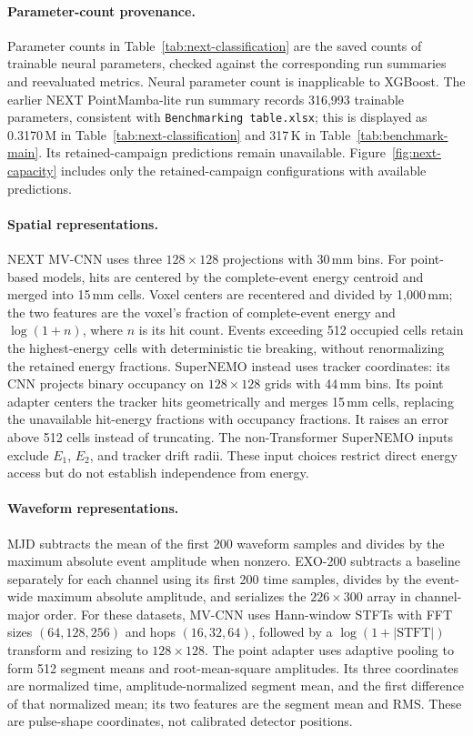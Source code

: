 \paragraph{Parameter-count provenance.}
Parameter counts in Table~\ref{tab:next-classification} are the saved
counts of trainable neural parameters, checked against the corresponding
run summaries and reevaluated metrics. Neural parameter count is
inapplicable to XGBoost. The earlier NEXT PointMamba-lite run summary records
316,993 trainable parameters, consistent with \texttt{Benchmarking table.xlsx};
this is displayed as 0.3170\,M in Table~\ref{tab:next-classification} and
317\,K in Table~\ref{tab:benchmark-main}. Its retained-campaign predictions
remain unavailable. Figure~\ref{fig:next-capacity} includes only the
retained-campaign configurations with available predictions.

\paragraph{Spatial representations.}
NEXT MV-CNN uses three $128\times128$ projections with 30\,mm bins. For point-based models, hits are centered by the complete-event energy centroid and merged into 15\,mm cells. Voxel centers are recentered and divided by 1,000\,mm; the two features are the voxel's fraction of complete-event energy and $\log(1+n)$, where $n$ is its hit count. Events exceeding 512 occupied cells retain the highest-energy cells with deterministic tie breaking, without renormalizing the retained energy fractions. SuperNEMO instead uses tracker coordinates: its CNN projects binary occupancy on $128\times128$ grids with 44\,mm bins. Its point adapter centers the tracker hits geometrically and merges 15\,mm cells, replacing the unavailable hit-energy fractions with occupancy fractions. It raises an error above 512 cells instead of truncating. The non-Transformer SuperNEMO inputs exclude $E_1$, $E_2$, and tracker drift radii. These input choices restrict direct energy access but do not establish independence from energy.

\paragraph{Waveform representations.}
MJD subtracts the mean of the first 200 waveform samples and divides by the maximum absolute event amplitude when nonzero. EXO-200 subtracts a baseline separately for each channel using its first 200 time samples, divides by the event-wide maximum absolute amplitude, and serializes the $226\times300$ array in channel-major order. For these datasets, MV-CNN uses Hann-window STFTs with FFT sizes $(64,128,256)$ and hops $(16,32,64)$, followed by a $\log(1+|\mathrm{STFT}|)$ transform and resizing to $128\times128$. The point adapter uses adaptive pooling to form 512 segment means and root-mean-square amplitudes. Its three coordinates are normalized time, amplitude-normalized segment mean, and the first difference of that normalized mean; its two features are the segment mean and RMS. These are pulse-shape coordinates, not calibrated detector positions.

